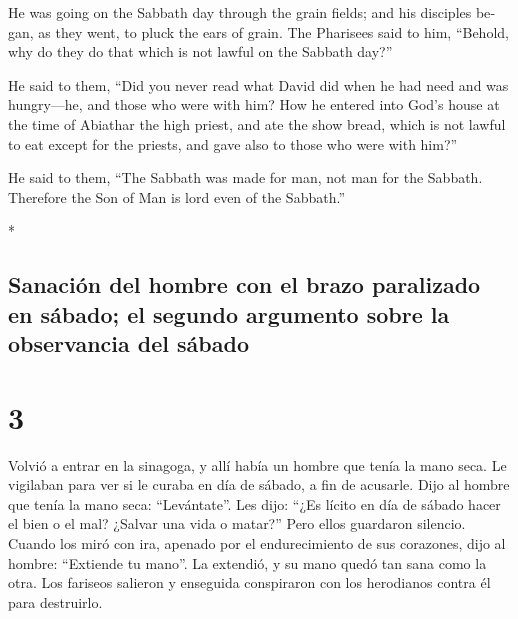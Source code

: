 \begin{paracol}{2}
\begin{otherlanguage}{english}
 He was going on the Sabbath day through the grain
fields; and his disciples began, as they went, to pluck the ears of
grain.  The Pharisees said to him, ``Behold, why do they
do that which is not lawful on the Sabbath day?''

 He said to them, ``Did you never read what David did
when he had need and was hungry---he, and those who were with him?
 How he entered into God's house at the time of Abiathar
the high priest, and ate the show bread, which is not lawful to eat
except for the priests, and gave also to those who were with him?''

 He said to them, ``The Sabbath was made for man, not man
for the Sabbath.  Therefore the Son of Man is lord even
of the Sabbath.''

\end{otherlanguage}

\switchcolumn[0]*

\hypertarget{sanaciuxf3n-del-hombre-con-el-brazo-paralizado-en-suxe1bado-el-segundo-argumento-sobre-la-observancia-del-suxe1bado}{%
\subsection{Sanación del hombre con el brazo paralizado en sábado; el
segundo argumento sobre la observancia del
sábado}\label{sanaciuxf3n-del-hombre-con-el-brazo-paralizado-en-suxe1bado-el-segundo-argumento-sobre-la-observancia-del-suxe1bado}}

\hypertarget{section-4}{%
\section{3}\label{section-4}}

 Volvió a entrar en la sinagoga, y allí había un hombre
que tenía la mano seca.  Le vigilaban para ver si le
curaba en día de sábado, a fin de acusarle.  Dijo al
hombre que tenía la mano seca: ``Levántate''.  Les dijo:
``¿Es lícito en día de sábado hacer el bien o el mal? ¿Salvar una vida o
matar?'' Pero ellos guardaron silencio.  Cuando los miró
con ira, apenado por el endurecimiento de sus corazones, dijo al hombre:
``Extiende tu mano''. La extendió, y su mano quedó tan sana como la
otra.  Los fariseos salieron y enseguida conspiraron con
los herodianos contra él para destruirlo.

\hypertarget{afluencia-de-personas-muchas-curaciones-en-el-lago}{%
}
\end{paracol}
